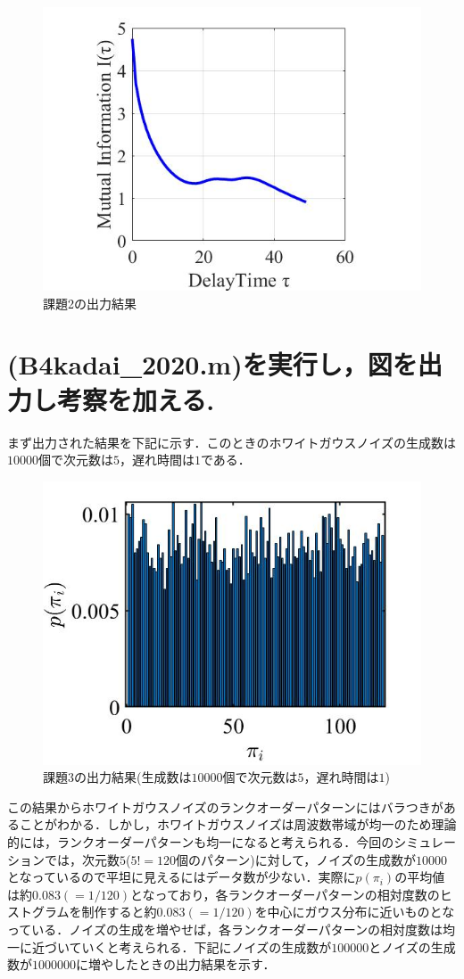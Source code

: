 \documentclass[autodetect-engine,dvipdfmx-if-dvi,ja=standard,a4paper,11pt]{bxjsarticle} %
\begin{document}
\begin{figure}[H]%
\begin{center}
\includegraphics[width=.4\textwidth]{kadai2_rusult.jpg}
\end{center}
\caption{課題2の出力結果}%
\label{fig:kadai2}
\end{figure}


\section{(B4kadai\_2020.m)を実行し，図を出力し考察を加える.}
まず出力された結果を下記に示す．このときのホワイトガウスノイズの生成数は$10000$個で次元数は$5$，遅れ時間は$1$である．

\begin{figure}[H]%
\begin{center}
\includegraphics[width=.4\textwidth]{kadai3_rusult.jpg}
\end{center}
\caption{課題3の出力結果(生成数は$10000$個で次元数は$5$，遅れ時間は$1$)}%
\label{fig:kadai3}
\end{figure}

この結果からホワイトガウスノイズのランクオーダーパターンにはバラつきがあることがわかる．しかし，ホワイトガウスノイズは周波数帯域が均一のため理論的には，ランクオーダーパターンも均一になると考えられる．今回のシミュレーションでは，次元数$5$($5!=120$個のパターン)に対して，ノイズの生成数が$10000$となっているので平坦に見えるにはデータ数が少ない．実際に$p(\pi_i)$の平均値は約$0.083(=1/120)$となっており，各ランクオーダーパターンの相対度数のヒストグラムを制作すると約$0.083(=1/120)$を中心にガウス分布に近いものとなっている．ノイズの生成を増やせば，各ランクオーダーパターンの相対度数は均一に近づいていくと考えられる．下記にノイズの生成数が$100000$とノイズの生成数が$1000000$に増やしたときの出力結果を示す．
\end{document}
